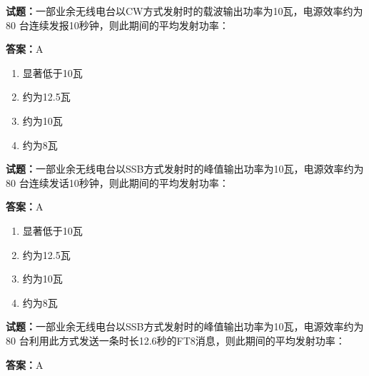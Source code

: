 \documentclass{ctexbook}
\begin{document}





\vspace{1em}

\textbf{试题：}一部业余无线电台以CW方式发射时的载波输出功率为10瓦，电源效率约为80%
台连续发报10秒钟，则此期间的平均发射功率： 

\textbf{答案：}A 

\begin{enumerate}[leftmargin=3em]
  \item 显著低于10瓦 

  \item 约为12.5瓦 

  \item 约为10瓦 

  \item 约为8瓦 

\end{enumerate}





\vspace{1em}

\textbf{试题：}一部业余无线电台以SSB方式发射时的峰值输出功率为10瓦，电源效率约为80%
台连续发话10秒钟，则此期间的平均发射功率： 

\textbf{答案：}A 

\begin{enumerate}[leftmargin=3em]
  \item 显著低于10瓦 

  \item 约为12.5瓦 

  \item 约为10瓦 

  \item 约为8瓦 

\end{enumerate}





\vspace{1em}

\textbf{试题：}一部业余无线电台以SSB方式发射时的峰值输出功率为10瓦，电源效率约为80%
台利用此方式发送一条时长12.6秒的FT8消息，则此期间的平均发射功率： 

\textbf{答案：}A 
\end{document}
